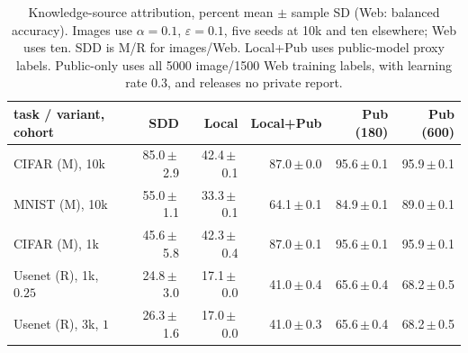 \begin{table}[t]
\centering
\caption{Knowledge-source attribution, percent mean $\pm$ sample SD (Web: balanced accuracy). Images use $\alpha=0.1$, $\varepsilon=0.1$, five seeds at 10k and ten elsewhere; Web uses ten. SDD is M/R for images/Web. Local+Pub uses public-model proxy labels. Public-only uses all 5000 image/1500 Web training labels, with learning rate 0.3, and releases no private report.}
\label{tab:attribution}
\small\setlength{\tabcolsep}{3pt}
\begin{tabular}{@{}lrrrrr@{}}\toprule
task / variant, cohort & SDD & Local & Local+Pub & Pub (180) & Pub (600) \\\midrule
CIFAR (M), 10k & 85.0\,$\pm$\,2.9 & 42.4\,$\pm$\,0.1 & 87.0\,$\pm$\,0.0 & 95.6\,$\pm$\,0.1 & 95.9\,$\pm$\,0.1 \\
MNIST (M), 10k & 55.0\,$\pm$\,1.1 & 33.3\,$\pm$\,0.1 & 64.1\,$\pm$\,0.1 & 84.9\,$\pm$\,0.1 & 89.0\,$\pm$\,0.1 \\
CIFAR (M), 1k & 45.6\,$\pm$\,5.8 & 42.3\,$\pm$\,0.4 & 87.0\,$\pm$\,0.1 & 95.6\,$\pm$\,0.1 & 95.9\,$\pm$\,0.1 \\
Usenet (R), 1k, $0.25$ & 24.8\,$\pm$\,3.0 & 17.1\,$\pm$\,0.0 & 41.0\,$\pm$\,0.4 & 65.6\,$\pm$\,0.4 & 68.2\,$\pm$\,0.5 \\
Usenet (R), 3k, $1$ & 26.3\,$\pm$\,1.6 & 17.0\,$\pm$\,0.0 & 41.0\,$\pm$\,0.3 & 65.6\,$\pm$\,0.4 & 68.2\,$\pm$\,0.5 \\
\bottomrule\end{tabular}
\end{table}
